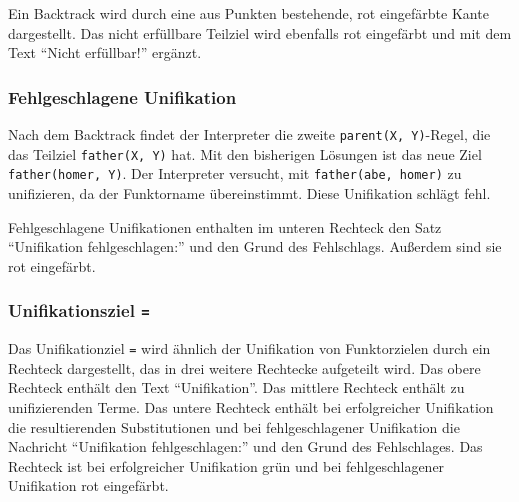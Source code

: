 \documentclass[parskip=full,11pt,twoside]{scrartcl}
\begin{document}
\begin{minipage}{\linewidth}
\end{minipage}

Ein Backtrack wird durch eine aus Punkten bestehende, rot eingefärbte Kante dargestellt.
Das nicht erfüllbare Teilziel wird ebenfalls rot eingefärbt und mit dem Text \enquote{Nicht erfüllbar!} ergänzt.

\subsubsection{Fehlgeschlagene Unifikation}

Nach dem Backtrack findet der Interpreter die zweite \texttt{parent(X, Y)}-Regel, die das Teilziel \texttt{father(X, Y)} hat.
Mit den bisherigen Lösungen ist das neue Ziel \texttt{father(homer, Y)}.
Der Interpreter versucht, mit \texttt{father(abe, homer)} zu unifizieren, da der Funktorname übereinstimmt.
Diese Unifikation schlägt fehl.

\begin{minipage}{\linewidth}
\end{minipage}

Fehlgeschlagene Unifikationen enthalten im unteren Rechteck den Satz \enquote{Unifikation fehlgeschlagen:} und den Grund des Fehlschlags.
Außerdem sind sie rot eingefärbt.

\subsubsection{Unifikationsziel \texttt{=}}

Das Unifikationziel \texttt{=} wird ähnlich der Unifikation von Funktorzielen durch ein Rechteck dargestellt, das in drei weitere Rechtecke aufgeteilt wird.
Das obere Rechteck enthält den Text \enquote{Unifikation}.
Das mittlere Rechteck enthält zu unifizierenden Terme.
Das untere Rechteck enthält bei erfolgreicher Unifikation die resultierenden Substitutionen und bei fehlgeschlagener Unifikation die Nachricht \enquote{Unifikation fehlgeschlagen:} und den Grund des Fehlschlages.
Das Rechteck ist bei erfolgreicher Unifikation grün und bei fehlgeschlagener Unifikation rot eingefärbt.
\end{document}
